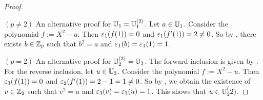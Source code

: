 \begin{proof}~
  
  $(p \neq 2)$ An alternative proof for $\mathbb{U}_1 = \mathbb{U}_1^{(2)}$.
  Let $a \in \mathbb{U}_1$. Consider the polynomial $f := X^2 - a$.
  Then $\varepsilon_1(f(1)) = 0$ and $\varepsilon_1(f'(1)) = 2 \neq 0$.
  So by ,
  there exists $b \in \mathbb{Z}_p$ such that $b^2 = a$ and $\varepsilon_1(b) = \varepsilon_1(1) = 1$.

  $(p = 2)$ An alternative proof for $\mathbb{U}_2^{(2)} = \mathbb{U}_3$.
  The forward inclusion is given by .
  For the reverse inclusion, let $u \in \mathbb{U}_3$. 
  Consider the polynomial $f := X^2 - u$. 
  Then $\varepsilon_3(f(1)) = 0$ and $\varepsilon_2(f'(1)) = 2 - 1 = 1 \neq 0$.
  So by ,
  we obtain the existence of $v \in \mathbb{Z}_2$ such that $v^2 = u$ and 
  $\varepsilon_3(v) = \varepsilon_3(u) = 1$. 
  This shows that $u \in \mathbb{U}_2^(2)$. 
\end{proof}

